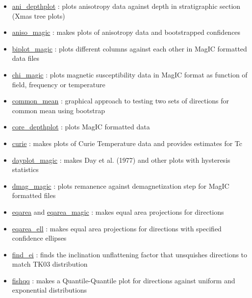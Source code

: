 \documentclass[11pt]{book}
\begin{document}
{{\begin{itemize}
  \item \href{https://pmagpy.github.io/PmagPy_plots_analysis.html#ani_depthplot}{ani\_depthplot} : plots anisotropy data against depth in stratigraphic section (Xmas tree plots)
\item \href{https://pmagpy.github.io/PmagPy_plots_analysis.html#aniso_magic}{aniso\_magic} : makes plots of anisotropy data and bootstrapped confidences
\item \href{https://pmagpy.github.io/PmagPy_plots_analysis.html#biplot_magic}{biplot\_magic} : plots different columns against each other in MagIC formatted data files
\item \href{https://pmagpy.github.io/PmagPy_plots_analysis.html#chi_magic}{chi\_magic} : plots magnetic susceptibility data in MagIC format as function of field, frequency or temperature
\item \href{https://pmagpy.github.io/PmagPy_plots_analysis.html#common_mean}{common\_mean} : graphical approach to testing two sets of directions for common mean using bootstrap
\item \href{https://pmagpy.github.io/PmagPy_plots_analysis.html#core_depthplot}{core\_depthplot} : plots MagIC formatted data
\item \href{https://pmagpy.github.io/PmagPy_plots_analysis.html#curie}{curie} : makes plots of Curie Temperature data and provides estimates for Tc
\item \href{https://pmagpy.github.io/PmagPy_plots_analysis.html#dayplot_magic}{dayplot\_magic} : makes Day et al. (1977) and other plots with hysteresis statistics
\item \href{https://pmagpy.github.io/PmagPy_plots_analysis.html#dmag_magic}{dmag\_magic} : plots remanence against demagnetization step for MagIC formatted files
\item \href{https://pmagpy.github.io/PmagPy_plots_analysis.html#eqarea}{eqarea} and \href{https://pmagpy.github.io/PmagPy_plots_analysis.html#eqarea_magic}{eqarea\_magic} : makes equal area projections for directions
\item \href{https://pmagpy.github.io/PmagPy_plots_analysis.html#eqarea_ell}{eqarea\_ell} : makes equal area projections for directions with specified confidence ellipses
\item \href{https://pmagpy.github.io/PmagPy_plots_analysis.html#find_ei}{find\_ei} : finds the inclination unflattening factor that unsquishes directions to match TK03 distribution
\item \href{https://pmagpy.github.io/PmagPy_plots_analysis.html#fishqq}{fishqq} : makes a Quantile-Quantile plot for directions against uniform and exponential distributions

\end{itemize}}}
\end{document}
